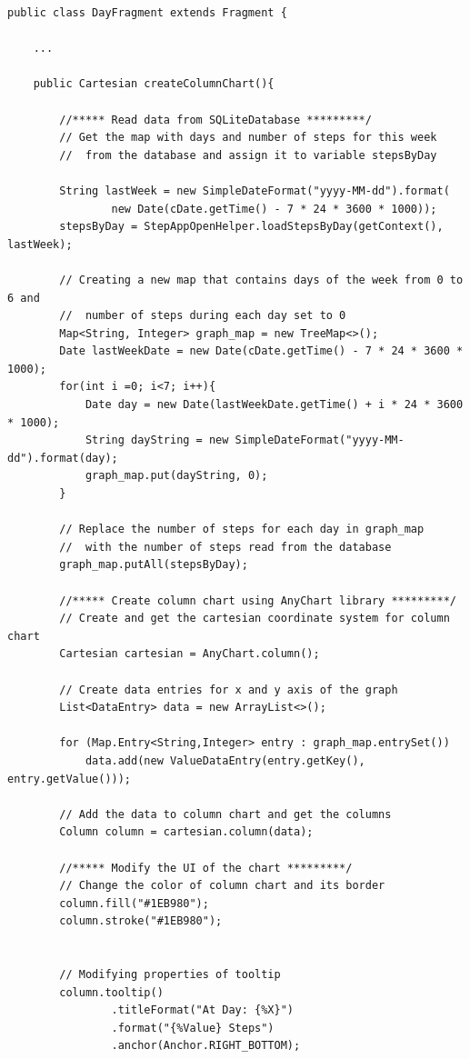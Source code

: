 \documentclass{usireport}
\begin{document}
\begin{verbatim}
public class DayFragment extends Fragment {

    ...

    public Cartesian createColumnChart(){

        //***** Read data from SQLiteDatabase *********/
        // Get the map with days and number of steps for this week
        //  from the database and assign it to variable stepsByDay

        String lastWeek = new SimpleDateFormat("yyyy-MM-dd").format(
                new Date(cDate.getTime() - 7 * 24 * 3600 * 1000));
        stepsByDay = StepAppOpenHelper.loadStepsByDay(getContext(), lastWeek);

        // Creating a new map that contains days of the week from 0 to 6 and
        //  number of steps during each day set to 0
        Map<String, Integer> graph_map = new TreeMap<>();
        Date lastWeekDate = new Date(cDate.getTime() - 7 * 24 * 3600 * 1000);
        for(int i =0; i<7; i++){
            Date day = new Date(lastWeekDate.getTime() + i * 24 * 3600 * 1000);
            String dayString = new SimpleDateFormat("yyyy-MM-dd").format(day);
            graph_map.put(dayString, 0);
        }

        // Replace the number of steps for each day in graph_map
        //  with the number of steps read from the database
        graph_map.putAll(stepsByDay);

        //***** Create column chart using AnyChart library *********/
        // Create and get the cartesian coordinate system for column chart
        Cartesian cartesian = AnyChart.column();

        // Create data entries for x and y axis of the graph
        List<DataEntry> data = new ArrayList<>();

        for (Map.Entry<String,Integer> entry : graph_map.entrySet())
            data.add(new ValueDataEntry(entry.getKey(), entry.getValue()));

        // Add the data to column chart and get the columns
        Column column = cartesian.column(data);

        //***** Modify the UI of the chart *********/
        // Change the color of column chart and its border
        column.fill("#1EB980");
        column.stroke("#1EB980");


        // Modifying properties of tooltip
        column.tooltip()
                .titleFormat("At Day: {%X}")
                .format("{%Value} Steps")
                .anchor(Anchor.RIGHT_BOTTOM);


\end{verbatim}
\end{document}
